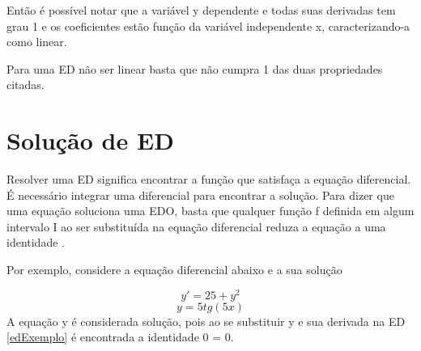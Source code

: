 Então é possível notar que a variável y dependente e todas suas derivadas tem grau 1 e os coeficientes estão função da variável independente x, caracterizando-a como linear.

Para uma ED não ser linear basta que não cumpra 1 das duas propriedades citadas.

\section[Solução de ED]{Solução de ED}

Resolver uma ED significa encontrar a função que satisfaça a equação diferencial. É necessário integrar uma diferencial para encontrar a solução.
Para dizer que uma equação soluciona uma EDO, basta que qualquer função f definida em algum intervalo I ao ser substituída na equação diferencial reduza a equação a uma identidade \cite{explicacaoEDO}.

\begin{flushleft}
Por exemplo, considere a equação diferencial abaixo e a sua solução 
\end{flushleft}

\begin{equation} \label{edExemplo} y' = 25 + y^2 \end{equation}  \begin{equation} y = 5tg(5x) \end{equation} A equação y é considerada solução, pois ao se substituir y e sua derivada na ED \ref{edExemplo} é encontrada a identidade 0 = 0.

